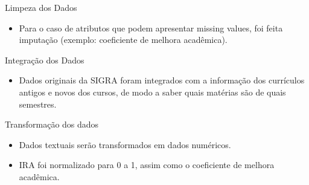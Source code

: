 \begin{frame}{Limpeza dos Dados}
\begin{itemize}[itemsep=3ex]
    \item Para o caso de atributos que podem apresentar missing values, foi feita
        imputação (exemplo: coeficiente de melhora acadêmica).
\end{itemize}
\end{frame}

\begin{frame}{Integração dos Dados}
\begin{itemize}[itemsep=3ex]
    \item Dados originais da SIGRA foram integrados com a informação dos currículos
        antigos e novos dos cursos, de modo a saber quais matérias são de quais
        semestres.
\end{itemize}
\end{frame}

\begin{frame}{Transformação dos dados}
\begin{itemize}[itemsep=3ex]
    \item Dados textuais serão transformados em dados numéricos.
    \item IRA foi normalizado para 0 a 1, assim como o coeficiente de melhora
        acadêmica.
\end{itemize}
\end{frame}

